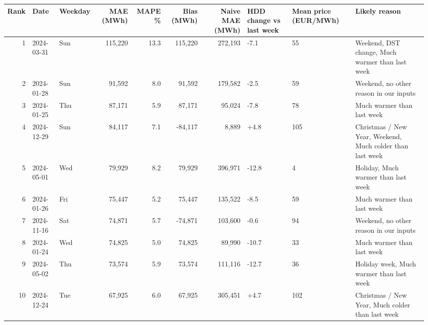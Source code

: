 \begin{tabular}{rllrrrrlll}
\toprule
Rank & Date & Weekday & MAE (MWh) & MAPE \% & Bias (MWh) & Naive MAE (MWh) & HDD change vs last week & Mean price (EUR/MWh) & Likely reason \\
\midrule
1 & 2024-03-31 & Sun & 115,220 & 13.3 & 115,220 & 272,193 & -7.1 & 55 & Weekend, DST change, Much warmer than last week \\
2 & 2024-01-28 & Sun & 91,592 & 8.0 & 91,592 & 179,582 & -2.5 & 59 & Weekend, no other reason in our inputs \\
3 & 2024-01-25 & Thu & 87,171 & 5.9 & 87,171 & 95,024 & -7.8 & 78 & Much warmer than last week \\
4 & 2024-12-29 & Sun & 84,117 & 7.1 & -84,117 & 8,889 & +4.8 & 105 & Christmas / New Year, Weekend, Much colder than last week \\
5 & 2024-05-01 & Wed & 79,929 & 8.2 & 79,929 & 396,971 & -12.8 & 4 & Holiday, Much warmer than last week \\
6 & 2024-01-26 & Fri & 75,447 & 5.2 & 75,447 & 135,522 & -8.5 & 59 & Much warmer than last week \\
7 & 2024-11-16 & Sat & 74,871 & 5.7 & -74,871 & 103,600 & -0.6 & 94 & Weekend, no other reason in our inputs \\
8 & 2024-01-24 & Wed & 74,825 & 5.0 & 74,825 & 89,990 & -10.7 & 33 & Much warmer than last week \\
9 & 2024-05-02 & Thu & 73,574 & 5.9 & 73,574 & 111,116 & -12.7 & 36 & Holiday week, Much warmer than last week \\
10 & 2024-12-24 & Tue & 67,925 & 6.0 & 67,925 & 305,451 & +4.7 & 102 & Christmas / New Year, Much colder than last week \\
\bottomrule
\end{tabular}
